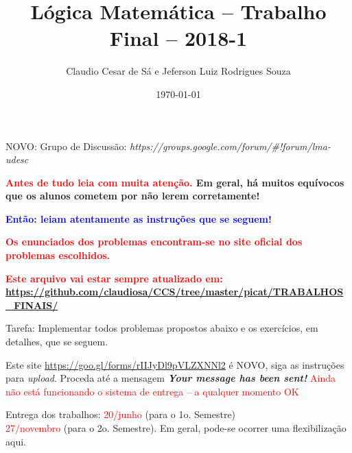\documentclass[a4paper,12pt]{article}
\title{Lógica Matemática -- Trabalho Final -- 2018-1}
\author{Claudio Cesar de Sá e Jeferson Luiz Rodrigues Souza}
\date{\today}
\begin{document}
\maketitle

\begin{flushleft}


\vspace{0.5cm}
 NOVO: Grupo de Discussão: {\em https://groups.google.com/forum/#!forum/lma-udesc}


\vspace{0.5cm}
  {\bf \textcolor{red}{
Antes de tudo leia com \textbf{muita atenção}.} Em geral, há muitos equívocos
que os alunos cometem por não lerem corretamente!}


\vspace{0.5cm}
 {\bf \textcolor{blue}{Então: leiam atentamente as
instruções que se seguem!}}


\vspace{0.5cm}
  {\bf \textcolor{red}{Os enunciados dos problemas encontram-se no site oficial dos problemas escolhidos.}}


\vspace{0.5cm}
  {\bf \textcolor{red}{Este arquivo vai estar sempre atualizado em: }}\\
{\bf \textcolor{red}{\url{https://github.com/claudiosa/CCS/tree/master/picat/TRABALHOS_FINAIS/}}}

\vspace{0.5cm}
 Tarefa: Implementar todos  
 problemas propostos abaixo e os exercícios, em detalhes, que se seguem. 



\vspace{0.5cm}
  Este site  \textcolor{red}{\url{https://goo.gl/forms/rIIJyDl9pVLZXNNl2}} é NOVO, siga as instruções para \emph{upload}. Proceda até
a mensagem \textbf{ \emph{Your message has been sent!}}
\vspace{0.25cm}
 \textcolor{red}{Ainda não está funcionando o sistema de entrega -- a qualquer momento OK}


\vspace{0.5cm}
 Entrega dos trabalhos: \textcolor{red}{20/junho} (para o 1o. Semestre)\\
\textcolor{red}{27/novembro} (para o 2o. Semestre). Em geral, pode-se
ocorrer uma flexibilização aqui.\\


\end{flushleft}
\end{document}
